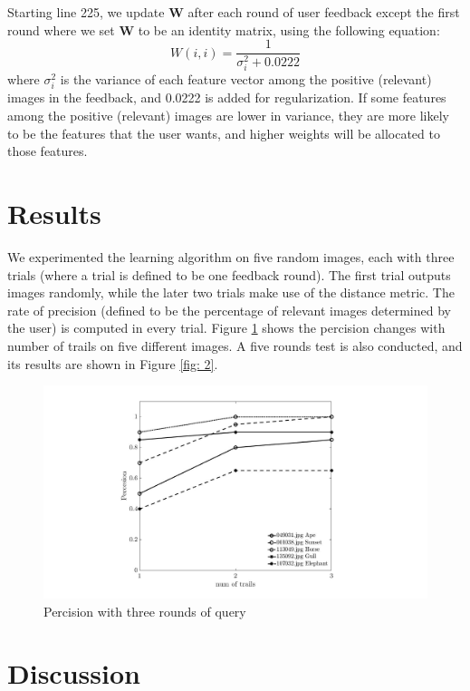 \documentclass{article}
\begin{document}
	\justify Starting line 225, we update $\mathbf{W}$ after each round of user feedback except the first round where we set $\mathbf{W}$ to be an identity matrix, using the following equation:
	$$W(i,i)=\frac{1}{\sigma^2_i+0.0222}$$
	where $\sigma_i^2$ is the variance of each feature vector among the positive (relevant) images in the feedback, and 0.0222 is added for regularization. If some features among the positive (relevant) images are lower in variance, they are more likely to be the features that the user wants, and higher weights will be allocated to those features.
	
	\section{Results}
	We experimented the learning algorithm on five random images, each with three trials (where a trial is defined to be one feedback round). The first trial outputs images randomly, while the later two trials make use of the distance metric. The rate of precision (defined to be the percentage of relevant images determined by the user) is computed in every trial. Figure \ref{fig: 1} shows the percision changes with number of trails on five different images. A five rounds test is also conducted, and its results are shown in Figure \ref{fig: 2}.
	\begin{figure}[H]
		\centering
		\includegraphics[width=\linewidth]{fig_1}
		\caption{Percision with three rounds of query}
		\label{fig: 1}
	\end{figure}

	
	
	\section{Discussion}
	
\end{document}
